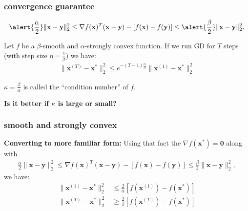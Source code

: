 \documentclass[compress]{beamer}
\newcommand{\bv}[1]{\mathbf{#1}}
\begin{document}
\begin{frame}[t]
	\frametitle{convergence guarantee}
	\begin{align*}
		\alert{\frac{\alpha}{2}}\|\bv{x} - \bv{y}\|_2^2 \leq \nabla f(\bv{x})^T(\bv{x} - \bv{y}) - \left[f(\bv{x}) - f(\bv{y})\right] \leq \alert{\frac{\beta}{2}}\|\bv{x} - \bv{y}\|_2^2.
	\end{align*}
	
	\begin{theorem}
		Let $f$ be a $\beta$-smooth and $\alpha$-strongly convex function. If we run GD for $T$ steps (with step size $\eta = \frac{1}{\beta}$) we have:
		\begin{align*}
			\|\bv{x}^{(T)} - \bv{x}^*\|_2^2 \leq e^{-(T-1)\frac{\alpha}{\beta}} \|\bv{x}^{(1)} - \bv{x}^*\|_2^2
		\end{align*} 
	\end{theorem}	
	\begin{center}
		\alert{$\kappa = \frac{\beta}{\alpha}$} is called the ``condition number'' of $f$. 
		
		\textbf{Is it better if $\kappa$ is large or small?}
	\end{center}
\end{frame}

\begin{frame}[t]
	\frametitle{smooth and strongly convex}
	\textbf{Converting to more familiar form:}
	Using that fact the $\nabla f(\bv{x}^*) = \bv{0}$ along with
	\begin{align*}
		{\frac{\alpha}{2}}\|\bv{x} - \bv{y}\|_2^2 \leq \nabla f(\bv{x})^T(\bv{x} - \bv{y}) - \left[f(\bv{x}) - f(\bv{y})\right] \leq {\frac{\beta}{2}}\|\bv{x} - \bv{y}\|_2^2, 
	\end{align*}
	we have:
	\begin{align*}
		\|\bv{x}^{(1)} - \bv{x}^*\|_2^2 &\leq \frac{2}{\alpha} \left[f(\bv{x}^{(1)}) - f(\bv{x}^*)\right]\\
		\|\bv{x}^{(T)} - \bv{x}^*\|_2^2 &\geq \frac{2}{\beta} \left[f(\bv{x}^{(T)}) - f(\bv{x}^*)\right]
	\end{align*}	
\end{frame}
\end{document}
